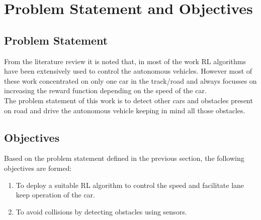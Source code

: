 \chapter{Problem Statement and Objectives}
\label{ch:PD}

\section{Problem Statement}
From the literature review it is noted that, in most of the work RL algorithms have been extensively used to control the autonomous vehicles. However most of these work concentrated on only one car in the track/road and always focusses on increasing the reward function depending on the speed of the car. \\
The problem statement of this work is to detect other cars and obstacles present on road and drive the autonomous vehicle keeping in mind all those obstacles. 

\section{Objectives}
Based on the problem statement defined in the previous section, the following objectives are formed:

\begin{enumerate}
	\item To deploy a suitable RL algorithm to control the speed and facilitate lane keep operation of the car. 
	\item To avoid collisions by detecting obstacles using sensors.
\end{enumerate}

%
%
	

